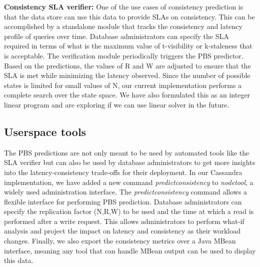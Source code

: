 
\textbf{Consistency SLA verifier:} One of the use cases of consistency
prediction is that the data store can use this data to provide SLAs on
consistency. This can be accomplished by a standalone module that tracks the
consistency and latency profile of queries over time. Database administrators
can specify the SLA required in terms of what is the maximum value of
t-visibility or k-staleness that is acceptable. The verification module
periodically triggers the PBS predictor. Based on the predictions, the values of
R and W are adjusted to ensure that the SLA is met while minimizing the latency
observed. Since the number of possible states is limited for small values of N,
our current implementation performs a complete search over the state space.
We have also formulated this as an integer linear program and are exploring if
we can use linear solver in the future.

\subsection{Userspace tools}
The PBS predictions are not only meant to be used by automated tools like the
SLA verifier but can also be used by database administrators to get more
insights into the latency-consistency trade-offs for their deployment. In our
Cassandra implementation, we have added a new command
\textit{predictconsistency} to \textit{nodetool}, a widely used administration
interface.  The \textit{predictconsistency} command allows a flexible interface
for performing PBS prediction. Database administrators can specify the
replication factor (N,R,W) to be used and the time at which a read is performed
after a write request. This allows administrators to perform what-if analysis
and project the impact on latency and consistency as their workload changes.
Finally, we also export the consistency metrics over a Java MBean interface,
meaning any tool that can handle MBean output can be used to display this
data.\\

